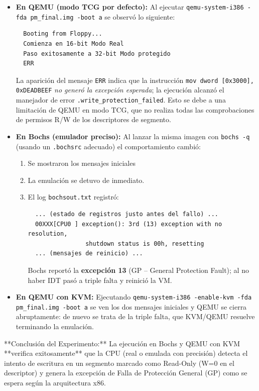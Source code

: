 \begin{itemize}
    \item \textbf{En QEMU (modo TCG por defecto):}
          Al ejecutar \verb|qemu-system-i386 -fda pm_final.img -boot a| se observó lo siguiente:
  \begin{verbatim}
  Booting from Floppy...
  Comienza en 16-bit Modo Real
  Paso exitosamente a 32-bit Modo protegido
  ERR
  \end{verbatim}
  
          La aparición del mensaje \texttt{ERR} indica que la instrucción
          \verb|mov dword [0x3000], 0xDEADBEEF|
          \emph{no generó la excepción esperada}; la ejecución alcanzó el
          manejador de error \texttt{.write\_protection\_failed}.
          Esto se debe a una limitación de QEMU en modo TCG, que no realiza todas
          las comprobaciones de permisos R/W de los descriptores de segmento.
  
    \item \textbf{En Bochs (emulador preciso):}
          Al lanzar la misma imagen con \verb|bochs -q| (usando un \texttt{.bochsrc}
          adecuado) el comportamiento cambió:
          \begin{enumerate}[label=(\alph*)]
            \item Se mostraron los mensajes iniciales 
            \item La emulación se detuvo de inmediato.
            \item El log \texttt{bochsout.txt} registró:
  \begin{verbatim}
  ... (estado de registros justo antes del fallo) ...
  00XXX[CPU0 ] exception(): 3rd (13) exception with no resolution,
                shutdown status is 00h, resetting
  ... (mensajes de reinicio) ...
  \end{verbatim}
                  Bochs reportó la \textbf{excepción 13} (GP – General Protection Fault);
                  al no haber IDT pasó a triple falta y reinició la VM.
          \end{enumerate}
  
    \item \textbf{En QEMU con KVM:}
          Ejecutando \verb|qemu-system-i386 -enable-kvm -fda pm_final.img -boot a|
          se ven los dos mensajes iniciales y QEMU se cierra abruptamente: de nuevo
          se trata de la triple falta, que KVM/QEMU resuelve terminando la emulación.
  \end{itemize}
  

**Conclusión del Experimento:** La ejecución en Bochs y QEMU con KVM **verifica exitosamente** que la CPU (real o emulada con precisión) detecta el intento de escritura en un segmento marcado como Read-Only (W=0 en el descriptor) y genera la excepción de Falla de Protección General (GP) como se espera según la arquitectura x86.

